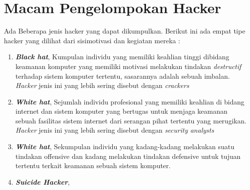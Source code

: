 \section{Macam Pengelompokan Hacker}
Ada Beberapa jenis hacker yang dapat dikumpulkan. Berikut ini ada empat tipe hacker yang dilihat dari sisimotivasi dan kegiatan mereka :
\begin{enumerate}
	\item
 \textbf{\emph{Black hat}}, Kumpulan individu yang memiliki keahlian tinggi dibidang keamanan komputer yang memiliki motivasi melakukan tindakan \textit{destructif} terhadap sistem komputer tertentu, sasarannya adalah sebuah imbalan. \textit{Hacker} jenis ini yang lebih sering disebut dengan \textit{crackers}
	\item
\textbf{\emph{White hat}}, Sejumlah individu profesional yang memiliki keahlian di bidang internet dan sistem komputer yang bertugas untuk menjaga keamanan sebuah fasilitas sistem internet dari serangan pihat tertentu yang merugikan. \textit{Hacker} jenis ini yang lebih sering disebut dengan \textit{security analysts}
\item
\textbf{\emph{White hat}}, Sekumpulan individu yang kadang-kadang melakukan suatu tindakan offensive dan kadang melakukan tindakan defensive untuk tujuan tertentu terkait keamanan sebuah sistem komputer.
\item 
\textbf{\emph{Suicide Hacker}},
\end{enumerate}

